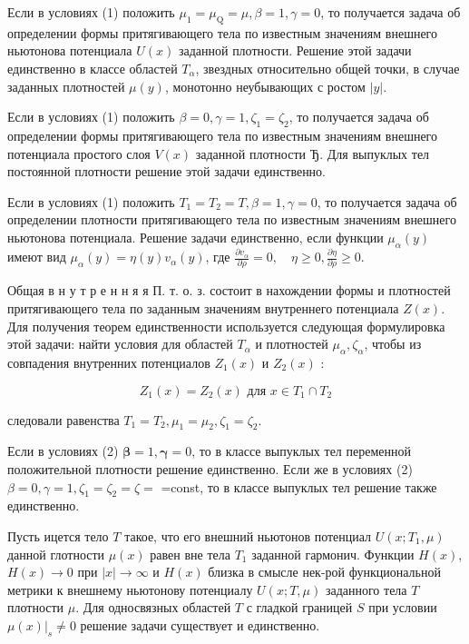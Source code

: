 \documentclass[10pt]{article}
\begin{document}
Если в условиях (1) положить $\mu_{1}=\mu_{\mathrm{Q}}=\mu, \beta=1, \gamma=0$, то получается задача об определении формы притягивающего тела по известным значениям внешнего ньютонова потенциала $U(x)$ заданной плотности. Решение этой задачи единственно в классе областей $T_{\alpha}$, звездных относительно общей точки, в случае заданных плотностей $\mu(y)$, монотонно неубывающих с ростом $|y|$.



Если в условиях (1) положить $\beta=0, \gamma=1, \zeta_{1}=\zeta_{2}$, то получается задача об определении формы притягивающего тела по известным значениям внешнего потенциала простого слоя $V(x)$ заданной плотности Ђ. Для выпуклых тел постоянной плотности решение этой задачи единственно.



Если в условиях (1) положить $T_{1}=T_{2}=T, \beta=1, \gamma=0$, то получается задача об определении плотности притягивающего тела по известным значениям внешнего ньютонова потенциала. Решение задачи единственно, если функции $\mu_{\alpha}(y)$ имеют вид $\mu_{\alpha}(y)=\eta(y) v_{\alpha}(y)$, где $\frac{\partial v_{\alpha}}{\partial \rho}=0, \quad \eta \geqslant 0, \frac{\partial \eta}{\partial \rho} \geqslant 0$.



Общая в н у т р е н н я я П. т. о. з. состоит в нахождении формы и плотностей притягивающего тела по заданным значениям внутреннего потенциала $Z(x)$. Для получения теорем единственности используется следующая формулировка этой задачи: найти условия для областей $T_{\alpha}$ и плотностей $\mu_{\alpha}, \zeta_{\alpha}$, чтобы из совпадения внутренних потенциалов $Z_{1}(x)$ и $Z_{2}(x)$ :



\[

Z_{1}(x)=Z_{2}(x) \text { для } x \in T_{1} \cap T_{2}

\]



следовали равенства $T_{1}=T_{2}, \mu_{1}=\mu_{2}, \zeta_{1}=\zeta_{2}$.



Если в условиях (2) $\boldsymbol{\beta}=1, \boldsymbol{\gamma}=0$, то в классе выпуклых тел переменной положительной плотности решение единственно. Если же в условиях (2) $\beta=0, \gamma=1, \zeta_{1}=\zeta_{2}=\zeta=$ =const, то в классе выпуклых тел решение также единственно.



Пусть ицется тело $T$ такое, что его внешний ньютонов потенциал $U\left(x ; T_{1}, \mu\right)$ данной глотности $\mu(x)$ равен вне тела $T_{1}$ заданной гармонич. Функции $H(x)$, $H(x) \rightarrow 0$ при $|x| \rightarrow \infty$ и $H(x)$ близка в смысле нек-рой функциональной метрики к внешнему ньютонову потенциалу $U(x ; T, \mu)$ заданного тела $T$ плотности $\mu$. Для односвязных областей $T$ с гладкой границей $S$ при условии $\left.\mu(x)\right|_{s} \neq 0$ решение задачи существует и единственно.
\end{document}
